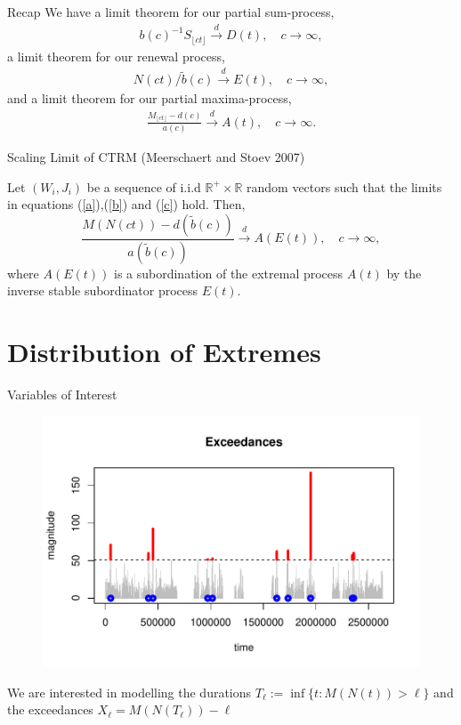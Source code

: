 \documentclass{beamer}
\newcommand{\cd}{\overset{d}{\longrightarrow}}
\newcommand{\Floor}[1]{{\lfloor {#1} \rfloor}}
\begin{document}
\begin{frame}{Recap}
We have a limit theorem for our partial sum-process,
\begin{align}\label{a}
	b(c)^{-1}S_\Floor{ct} \cd D(t), \quad c \to \infty,
\end{align}
a limit theorem for our renewal process,
\begin{align}\label{b}
	N(ct) / \tilde b(c) \cd E(t), \quad c \to \infty,
\end{align}
and a limit theorem for our partial maxima-process,
\begin{align}\label{c}
	\frac{M_\Floor{ct}-d(c)}{a(c)} \cd A(t), \quad c \to \infty.
\end{align}
\end{frame}

\begin{frame}{Scaling Limit of CTRM}
(Meerschaert and Stoev 2007)

Let $(W_i,J_i)$ be a sequence of i.i.d $\mathbb{R}^+\times\mathbb{R}$ random vectors such that the limits in equations (\ref{a}),(\ref{b}) and (\ref{c}) hold. Then,
        \[
            \frac{M(N(ct))-d(\tilde{b}(c))}{a(\tilde{b}(c))} \cd A(E(t)), \quad c\to\infty,
        \]
where $A(E(t))$ is a subordination of the extremal process $A(t)$ by the inverse stable subordinator process $E(t)$.\\

\end{frame}

\section{Distribution of Extremes}

\begin{frame}{Variables of Interest}

    \begin{figure}
        \centering
        \vspace{-0.5cm}
        \hspace{-0cm}
        \includegraphics[scale=0.6]{Thesis/Figures/Exceedances.pdf}
    \end{figure}
    We are interested in modelling the durations $T_\ell := \inf\{t: M(N(t)) > \ell\}$ and the exceedances $X_\ell=M(N(T_\ell))-\ell$    
\end{frame}
\end{document}
